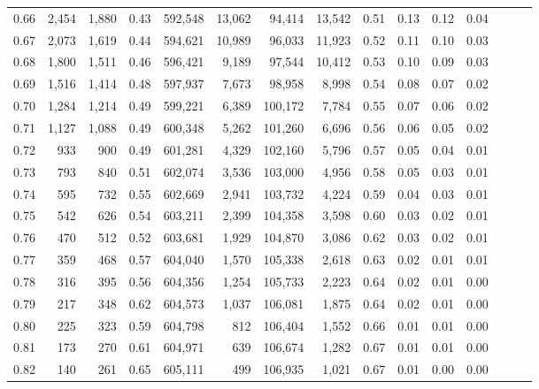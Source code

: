 \begin{tabular}{rrrrrrrrrrrrrrr}
0.66 &   2,454 &  1,880 &  0.43 &  592,548 &   13,062 &   94,414 &   13,542 &  0.51 &  0.13 &  0.12 &      0.04 \\
0.67 &   2,073 &  1,619 &  0.44 &  594,621 &   10,989 &   96,033 &   11,923 &  0.52 &  0.11 &  0.10 &      0.03 \\
0.68 &   1,800 &  1,511 &  0.46 &  596,421 &    9,189 &   97,544 &   10,412 &  0.53 &  0.10 &  0.09 &      0.03 \\
0.69 &   1,516 &  1,414 &  0.48 &  597,937 &    7,673 &   98,958 &    8,998 &  0.54 &  0.08 &  0.07 &      0.02 \\
0.70 &   1,284 &  1,214 &  0.49 &  599,221 &    6,389 &  100,172 &    7,784 &  0.55 &  0.07 &  0.06 &      0.02 \\
0.71 &   1,127 &  1,088 &  0.49 &  600,348 &    5,262 &  101,260 &    6,696 &  0.56 &  0.06 &  0.05 &      0.02 \\
0.72 &     933 &    900 &  0.49 &  601,281 &    4,329 &  102,160 &    5,796 &  0.57 &  0.05 &  0.04 &      0.01 \\
0.73 &     793 &    840 &  0.51 &  602,074 &    3,536 &  103,000 &    4,956 &  0.58 &  0.05 &  0.03 &      0.01 \\
0.74 &     595 &    732 &  0.55 &  602,669 &    2,941 &  103,732 &    4,224 &  0.59 &  0.04 &  0.03 &      0.01 \\
0.75 &     542 &    626 &  0.54 &  603,211 &    2,399 &  104,358 &    3,598 &  0.60 &  0.03 &  0.02 &      0.01 \\
0.76 &     470 &    512 &  0.52 &  603,681 &    1,929 &  104,870 &    3,086 &  0.62 &  0.03 &  0.02 &      0.01 \\
0.77 &     359 &    468 &  0.57 &  604,040 &    1,570 &  105,338 &    2,618 &  0.63 &  0.02 &  0.01 &      0.01 \\
0.78 &     316 &    395 &  0.56 &  604,356 &    1,254 &  105,733 &    2,223 &  0.64 &  0.02 &  0.01 &      0.00 \\
0.79 &     217 &    348 &  0.62 &  604,573 &    1,037 &  106,081 &    1,875 &  0.64 &  0.02 &  0.01 &      0.00 \\
0.80 &     225 &    323 &  0.59 &  604,798 &      812 &  106,404 &    1,552 &  0.66 &  0.01 &  0.01 &      0.00 \\
0.81 &     173 &    270 &  0.61 &  604,971 &      639 &  106,674 &    1,282 &  0.67 &  0.01 &  0.01 &      0.00 \\
0.82 &     140 &    261 &  0.65 &  605,111 &      499 &  106,935 &    1,021 &  0.67 &  0.01 &  0.00 &      0.00 \\

\end{tabular}
